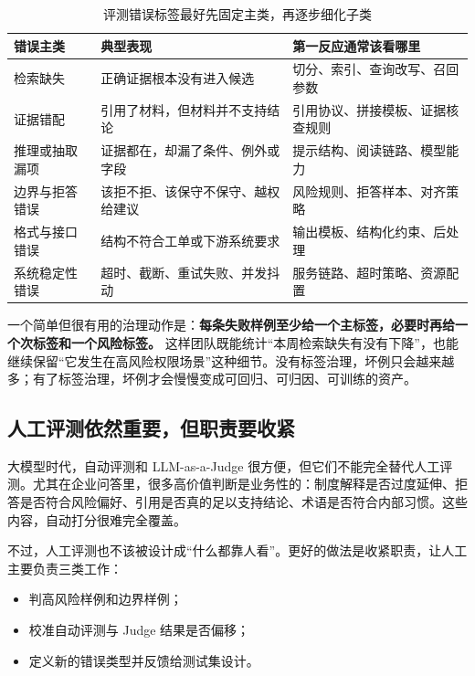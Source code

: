 \begin{table}[H]
\centering
\small
\begin{tabularx}{\textwidth}{>{\raggedright\arraybackslash}p{2.6cm}>{\raggedright\arraybackslash}p{3.3cm}>{\raggedright\arraybackslash}X}
\toprule
\textbf{错误主类} & \textbf{典型表现} & \textbf{第一反应通常该看哪里} \\
\midrule
检索缺失 & 正确证据根本没有进入候选 & 切分、索引、查询改写、召回参数 \\
证据错配 & 引用了材料，但材料并不支持结论 & 引用协议、拼接模板、证据核查规则 \\
推理或抽取漏项 & 证据都在，却漏了条件、例外或字段 & 提示结构、阅读链路、模型能力 \\
边界与拒答错误 & 该拒不拒、该保守不保守、越权给建议 & 风险规则、拒答样本、对齐策略 \\
格式与接口错误 & 结构不符合工单或下游系统要求 & 输出模板、结构化约束、后处理 \\
系统稳定性错误 & 超时、截断、重试失败、并发抖动 & 服务链路、超时策略、资源配置 \\
\bottomrule
\end{tabularx}
\caption{评测错误标签最好先固定主类，再逐步细化子类}
\label{tab:eval-error-taxonomy}
\end{table}

一个简单但很有用的治理动作是：\textbf{每条失败样例至少给一个主标签，必要时再给一个次标签和一个风险标签。} 这样团队既能统计“本周检索缺失有没有下降”，也能继续保留“它发生在高风险权限场景”这种细节。没有标签治理，坏例只会越来越多；有了标签治理，坏例才会慢慢变成可回归、可归因、可训练的资产。

\subsection{人工评测依然重要，但职责要收紧}
大模型时代，自动评测和 LLM-as-a-Judge 很方便，但它们不能完全替代人工评测。尤其在企业问答里，很多高价值判断是业务性的：制度解释是否过度延伸、拒答是否符合风险偏好、引用是否真的足以支持结论、术语是否符合内部习惯。这些内容，自动打分很难完全覆盖。

不过，人工评测也不该被设计成“什么都靠人看”。更好的做法是收紧职责，让人工主要负责三类工作：
\begin{itemize}
  \item 判高风险样例和边界样例；
  \item 校准自动评测与 Judge 结果是否偏移；
  \item 定义新的错误类型并反馈给测试集设计。
\end{itemize}

